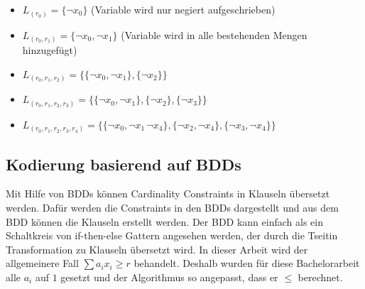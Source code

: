 \documentclass[a4,abstract=on]{scrartcl}
\begin{document}
\begin{itemize}
\item $ L_{(r_0)}=\{\neg x_0\}$ (Variable wird nur negiert aufgeschrieben)
\item $ L_{(r_0,r_1)}=\{\neg x_0,\neg x_1\}$ (Variable wird in alle bestehenden Mengen hinzugefügt)
\item $ L_{(r_0,r_1,r_2)}=\{\{\neg x_0, \neg x_1\},\{\neg x_2\}\}$
\item $ L_{(r_0,r_1,r_2,r_3)}=\{\{\neg x_0, \neg x_1\},\{\neg x_2\}, \{\neg x_3\}\}$
\item $ L_{(r_0,r_1,r_2,r_3,r_4)}=\{\{\neg x_0, \neg x_1\, \neg x_4\},\{\neg x_2, \neg x_4\}, \{\neg x_3, \neg x_4\}\}$
\end{itemize}


	\subsection{Kodierung basierend auf BDDs}
Mit Hilfe von BDDs \cite[vgl.][]{bddkod} können Cardinality Constraints in Klauseln übersetzt werden. Dafür werden die Constraints in den BDDs dargestellt und aus dem BDD können die Klauseln erstellt werden. Der BDD kann einfach als ein Schaltkreis von if-then-else Gattern angesehen werden, der durch die Tseitin Transformation zu Klauseln übersetzt wird. In dieser Arbeit \cite[][Seite 11]{niklasse} wird der allgemeinere Fall $\sum a_i x_i \geq r$ behandelt. Deshalb wurden für diese Bachelorarbeit alle $a_i$ auf $1$ gesetzt und der Algorithmus so angepasst, dass er $\leq$ berechnet.
\end{document}
